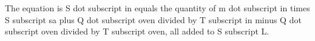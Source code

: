 The equation is S dot subscript in equals the quantity of m dot subscript in times S subscript sa plus Q dot subscript oven divided by T subscript in minus Q dot subscript oven divided by T subscript oven, all added to S subscript L.